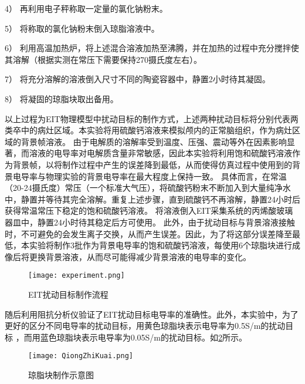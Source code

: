 4） 再利用电子秤称取一定量的氯化钠粉末。

5） 将称取的氯化钠粉末倒入琼脂溶液中。

6） 利用高温加热炉，将上述混合溶液加热至沸腾，并在加热的过程中充分搅拌使其溶解（根据实测在常压下需要保持270摄氏度左右）。

7） 将充分溶解的溶液倒入尺寸不同的陶瓷容器中，静置2小时待其凝固。

8） 将凝固的琼脂块取出备用。

以上过程为EIT物理模型中扰动目标的制作方式，上述两种扰动目标将分别代表两类卒中的病灶区域。本实验将用硫酸钙溶液来模拟颅内的正常脑组织，作为病灶区域的背景帧溶液。
由于电解质的溶解率受到温度、压强、震动等外在因素影响显著，而溶液的电导率对电解质含量非常敏感，因此本实验将利用饱和硫酸钙溶液作为背景帧，以将制作过程中产生的误差降到最低，从而使得仿真过程中使用到的背景电导率与物理实验的背景电导率在最大程度上保持一致。
具体而言，在常温（20-24摄氏度）常压（一个标准大气压），将硫酸钙粉末不断加入到大量纯净水中，静置并等待其完全溶解。重复上述步骤，直到硫酸钙不再溶解，静置24小时后获得常温常压下稳定的饱和硫酸钙溶液。
将溶液倒入EIT采集系统的丙烯酸玻璃器皿中，静置24小时待其稳定后方可使用。
此外，由于扰动目标与背景溶液接触时，不可避免的会发生离子交换，从而产生误差。因此，为了将这部分误差降至最低，本实验将制作3批作为背景电导率的饱和硫酸钙溶液，每使用6个琼脂块进行成像后将更换背景溶液，从而尽可能得减少背景溶液的电导率的变化。






\begin{figure}[H]
    \centering
    \texttt{[image: experiment.png]}
    \caption{EIT扰动目标制作流程}
    \label{figure:experiment}
\end{figure}

随后利用阻抗分析仪验证了EIT扰动目标电导率的准确性。此外，本实验中，为了更好的区分不同电导率的扰动目标，用黄色琼脂块表示电导率为0.5S/m的扰动目标
，而用蓝色琼脂块表示电导率为0.05S/m的扰动目标。如\cref{figure:QiongZhiKuai}所示。


\begin{figure}[h]
    \centering

    \texttt{[image: QiongZhiKuai.png]}
    \caption{琼脂块制作示意图}
    \label{figure:QiongZhiKuai}
\end{figure}






